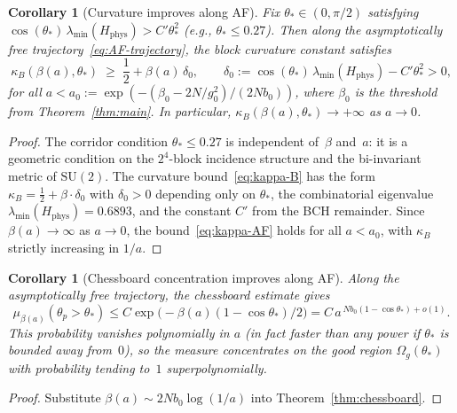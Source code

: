 \documentclass[11pt,a4paper]{article}
\theoremstyle{plain}
\newtheorem{corollary}[theorem]{Corollary}
\theoremstyle{definition}
\theoremstyle{remark}
\newcommand{\SU}{\mathrm{SU}}
\begin{document}
\begin{corollary}[Curvature improves along AF]\label{cor:AF-curvature}
Fix $\theta_* \in (0, \pi/2)$ satisfying
$\cos(\theta_*)\,\lambda_{\min}(H_{\mathrm{phys}}) > C'\theta_*^2$
(e.g., $\theta_* \leq 0.27$).  Then along the asymptotically free
trajectory~\eqref{eq:AF-trajectory}, the block curvature constant
satisfies
\begin{equation}\label{eq:kappa-AF}
\kappa_B(\beta(a), \theta_*) \;\geq\;
\frac{1}{2} + \beta(a)\,\delta_0,
\qquad
\delta_0 := \cos(\theta_*)\,\lambda_{\min}(H_{\mathrm{phys}}) - C'\theta_*^2 > 0,
\end{equation}
for all $a < a_0 := \exp(-(\beta_0 - 2N/g_0^2)/(2Nb_0))$,
where $\beta_0$ is the threshold from
Theorem~\textup{\ref{thm:main}}.  In particular,
$\kappa_B(\beta(a), \theta_*) \to +\infty$ as $a \to 0$.
\end{corollary}

\begin{proof}
The corridor condition $\theta_* \leq 0.27$ is independent of~$\beta$
and~$a$: it is a geometric condition on the $2^4$-block incidence
structure and the bi-invariant metric of $\SU(2)$.  The curvature
bound~\eqref{eq:kappa-B} has the form
$\kappa_B = \frac{1}{2} + \beta \cdot \delta_0$ with
$\delta_0 > 0$ depending only on $\theta_*$, the combinatorial
eigenvalue $\lambda_{\min}(H_{\mathrm{phys}}) = 0.6893$, and the
constant $C'$ from the BCH remainder.  Since $\beta(a) \to \infty$
as $a \to 0$, the bound~\eqref{eq:kappa-AF} holds for all
$a < a_0$, with $\kappa_B$ strictly increasing in $1/a$.
\end{proof}

\begin{corollary}[Chessboard concentration improves along AF]
\label{cor:AF-chessboard}
Along the asymptotically free trajectory, the chessboard estimate
gives
\begin{equation}
\mu_{\beta(a)}(\theta_p > \theta_*)
\leq C\exp\!\bigl(-\beta(a)(1 - \cos\theta_*)/2\bigr)
= C\,a^{\,Nb_0(1-\cos\theta_*) + o(1)}.
\end{equation}
This probability vanishes polynomially in $a$ (in fact faster
than any power if $\theta_*$ is bounded away from~$0$), so the
measure concentrates on the good region $\Omega_g(\theta_*)$
with probability tending to~$1$ superpolynomially.
\end{corollary}

\begin{proof}
Substitute $\beta(a) \sim 2Nb_0\log(1/a)$ into
Theorem~\ref{thm:chessboard}.
\end{proof}
\end{document}
